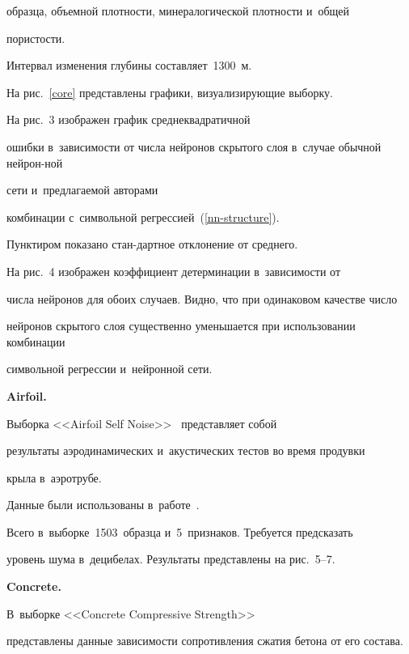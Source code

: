 \noindent

 образца, объемной плотности, минералогической плотности и~общей 

пористости.

Интервал изменения глубины составляет~1300~м.

На рис.~\ref{core}  представлены графики, визуализирующие выборку.



На рис.~3 изображен график среднеквадратичной

 ошибки в~зависимости от числа нейронов скрытого слоя в~случае обычной нейрон-\linebreak ной 

 сети и~предлагаемой авторами\linebreak

  комбинации с~символьной регрессией~(\ref{nn-structure}).

  Пунктиром показано стан-\linebreak дартное отклонение от среднего.



На рис.~4 изображен коэффициент детерминации в~зависимости от 

числа нейронов для обоих случаев. Видно, что при одинаковом качестве число 

нейронов скрытого слоя существенно уменьшается при использовании комбинации 

символьной регрессии и~нейронной сети.







\textbf{Airfoil.}

Выборка <<Airfoil Self Noise>>~\cite{uci_airfoil} представляет собой 

результаты аэродинамических и~акустических тестов во время продувки 

крыла в~аэротрубе.

Данные были использованы в~работе~\cite{airfoil_1}.

Всего в~выборке~1503~образца и~5~признаков. Требуется предсказать 

уровень шума в~децибелах. Результаты представлены на рис.~5--7.



\textbf{Concrete.}

В~выборке <<Concrete Compressive Strength>>~\cite{uci_concrete} 

представлены данные зависимости сопротивления сжатия бетона от его состава.

